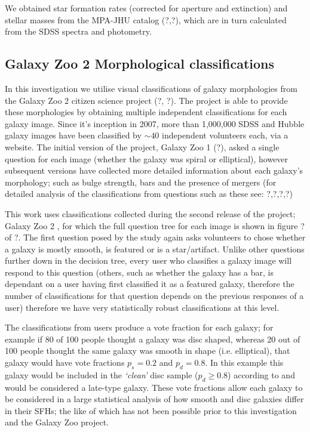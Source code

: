 \documentclass{mn2e}
\begin{document}
We obtained star formation rates (corrected for aperture and extinction) and stellar masses from the MPA-JHU catalog (?,?), which are in turn calculated from the SDSS spectra and photometry. 

\subsection{Galaxy Zoo 2 Morphological classifications}\label{class}

In this investigation we utilise visual classifications of galaxy morphologies from the Galaxy Zoo 2 citizen science project (?, ?). The project is able to provide these morphologies by obtaining multiple independent classifications for each galaxy image. Since it's inception in 2007, more than 1,000,000 SDSS and Hubble galaxy images have been classified by $\sim 40$ independent volunteers each, via a website. The initial version of the project, Galaxy Zoo 1 (?), asked a single question for each image (whether the galaxy was spiral or elliptical), however subsequent versions have collected more detailed information about each galaxy's morphology; such as bulge strength, bars and the presence of mergers (for detailed analysis of the classifications from questions such as these see: ?,?,?,?)

This work uses classifications collected during the second release of the project; Galaxy Zoo 2 \citep{GZ2}, for which the full question tree for each image is shown in figure ? of ?. The first question posed by the study again asks volunteers to chose whether a galaxy is mostly smooth, is featured or is a star/artifact. Unlike other questions further down in the decision tree, every user who classifies a galaxy image will respond to this question (others, such as whether the galaxy has a bar, is dependant on a user having first classified it as a featured galaxy, therefore the number of classifications for that question depends on the previous responses of a user) therefore we have very statistically robust classifications at this level. 

The classifications from users produce a vote fraction for each galaxy; for example if 80 of 100 people thought a galaxy was disc shaped, whereas 20 out of 100 people thought the same galaxy was smooth in shape (i.e. elliptical), that galaxy would have vote fractions $p_{s} = 0.2$ and $p_{d} = 0.8$. In this example this galaxy would be included in the \emph{`clean'} disc sample ($p_d \geq 0.8$) according to \cite{GZ2} and would be considered a late-type galaxy. These vote fractions allow each galaxy to be considered in a large statistical analysis of how smooth and disc galaxies differ in their SFHs; the like of which has not been possible prior to this investigation and the Galaxy Zoo project. 
\end{document}
